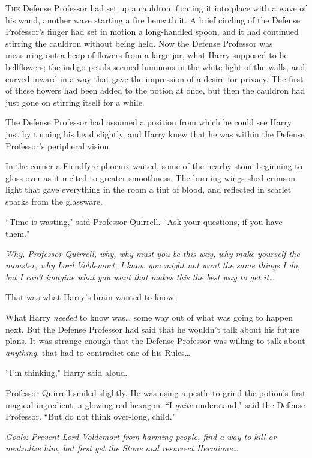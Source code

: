 
\lettrine{T}{he} Defense Professor had set up a cauldron, floating it into place with a wave of his wand, another wave starting a fire beneath it. A brief circling of the Defense Professor's finger had set in motion a long-handled spoon, and it had continued stirring the cauldron without being held. Now the Defense Professor was measuring out a heap of flowers from a large jar, what Harry supposed to be bellflowers; the indigo petals seemed luminous in the white light of the walls, and curved inward in a way that gave the impression of a desire for privacy. The first of these flowers had been added to the potion at once, but then the cauldron had just gone on stirring itself for a while.

The Defense Professor had assumed a position from which he could see Harry just by turning his head slightly, and Harry knew that he was within the Defense Professor's peripheral vision.

In the corner a Fiendfyre phoenix waited, some of the nearby stone beginning to gloss over as it melted to greater smoothness. The burning wings shed crimson light that gave everything in the room a tint of blood, and reflected in scarlet sparks from the glassware.

``Time is wasting," said Professor Quirrell. ``Ask your questions, if you have them."

\emph{Why, Professor Quirrell, why, why must you be this way, why make yourself the monster, why Lord Voldemort, I know you might not want the same things I do, but I can't imagine what you want that makes \emph{this} the best way to get it{\ldots}}

That was what Harry's brain wanted to know.

What Harry \emph{needed} to know was{\ldots} some way out of what was going to happen next. But the Defense Professor had said that he wouldn't talk about his future plans. It was strange enough that the Defense Professor was willing to talk about \emph{anything}, that had to contradict one of his Rules{\ldots}

``I'm thinking," Harry said aloud.

Professor Quirrell smiled slightly. He was using a pestle to grind the potion's first magical ingredient, a glowing red hexagon. ``I \emph{quite} understand," said the Defense Professor. ``But do not think over-long, child."

\emph{Goals: Prevent Lord Voldemort from harming people, find a way to kill or neutralize him, but first get the Stone and resurrect Hermione{\ldots}}

